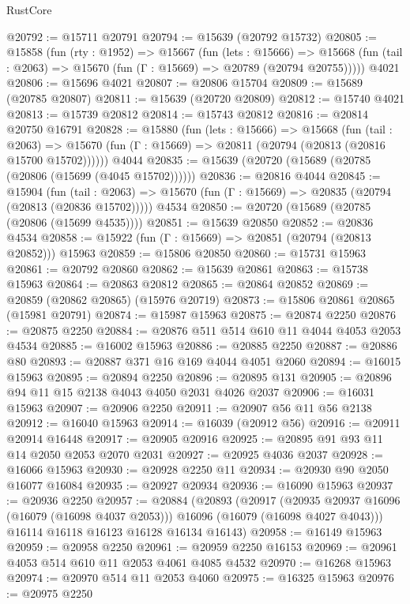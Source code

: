 \begin{lexlean}{RustCore}
\begin{coremodule}
@20792 := @15711 @20791
@20794 := @15639 (@20792 @15732)
@20805 := @15858
    (fun (rty : @1952) =>
    @15667
      (fun (lets : @15666) =>
      @15668 (fun (tail : @2063) => @15670 (fun (Γ : @15669) => @20789 (@20794 @20755)))))
    @4021
@20806 := @15696 @4021
@20807 := @20806 @15704
@20809 := @15689 (@20785 @20807)
@20811 := @15639 (@20720 @20809)
@20812 := @15740 @4021
@20813 := @15739 @20812
@20814 := @15743 @20812
@20816 := @20814 @20750 @16791
@20828 := @15880
    (fun (lets : @15666) =>
    @15668
      (fun (tail : @2063) =>
      @15670 (fun (Γ : @15669) => @20811 (@20794 (@20813 (@20816 @15700 @15702))))))
    @4044
@20835 := @15639 (@20720 (@15689 (@20785 (@20806 (@15699 (@4045 @15702))))))
@20836 := @20816 @4044
@20845 := @15904
    (fun (tail : @2063) => @15670 (fun (Γ : @15669) => @20835 (@20794 (@20813 (@20836 @15702)))))
    @4534
@20850 := @20720 (@15689 (@20785 (@20806 (@15699 @4535))))
@20851 := @15639 @20850
@20852 := @20836 @4534
@20858 := @15922 (fun (Γ : @15669) => @20851 (@20794 (@20813 @20852))) @15963
@20859 := @15806 @20850
@20860 := @15731 @15963
@20861 := @20792 @20860
@20862 := @15639 @20861
@20863 := @15738 @15963
@20864 := @20863 @20812
@20865 := @20864 @20852
@20869 := @20859 (@20862 @20865) (@15976 @20719)
@20873 := @15806 @20861 @20865 (@15981 @20791)
@20874 := @15987 @15963
@20875 := @20874 @2250
@20876 := @20875 @2250
@20884 := @20876 @511 @514 @610 @11 @4044 @4053 @2053 @4534
@20885 := @16002 @15963
@20886 := @20885 @2250
@20887 := @20886 @80
@20893 := @20887 @371 @16 @169 @4044 @4051 @2060
@20894 := @16015 @15963
@20895 := @20894 @2250
@20896 := @20895 @131
@20905 := @20896 @94 @11 @15 @2138 @4043 @4050 @2031 @4026 @2037
@20906 := @16031 @15963
@20907 := @20906 @2250
@20911 := @20907 @56 @11 @56 @2138
@20912 := @16040 @15963
@20914 := @16039 (@20912 @56)
@20916 := @20911 @20914 @16448
@20917 := @20905 @20916
@20925 := @20895 @91 @93 @11 @14 @2050 @2053 @2070 @2031
@20927 := @20925 @4036 @2037
@20928 := @16066 @15963
@20930 := @20928 @2250 @11
@20934 := @20930 @90 @2050 @16077 @16084
@20935 := @20927 @20934
@20936 := @16090 @15963
@20937 := @20936 @2250
@20957 := @20884
    (@20893
      (@20917
        (@20935 @20937 @16096 (@16079 (@16098 @4037 @2053)))
        @16096
        (@16079 (@16098 @4027 @4043)))
      @16114
      @16118
      @16123
      @16128
      @16134
      @16143)
@20958 := @16149 @15963
@20959 := @20958 @2250
@20961 := @20959 @2250 @16153
@20969 := @20961 @4053 @514 @610 @11 @2053 @4061 @4085 @4532
@20970 := @16268 @15963
@20974 := @20970 @514 @11 @2053 @4060
@20975 := @16325 @15963
@20976 := @20975 @2250

\end{coremodule}
\end{lexlean}
